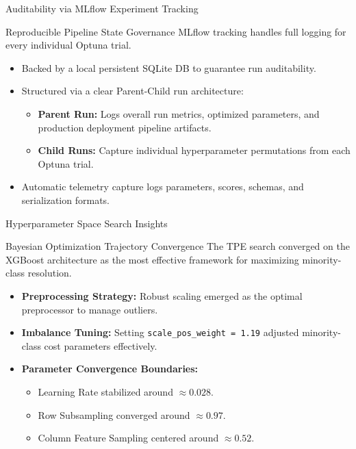 \begin{frame}{Auditability via MLflow Experiment Tracking}
\begin{block}{Reproducible Pipeline State Governance}
MLflow tracking handles full logging for every individual Optuna trial.
\end{block}
\begin{itemize}
    \item Backed by a local persistent SQLite DB to guarantee run auditability.
    \item Structured via a clear Parent-Child run architecture:
    \begin{itemize}
        \item \textbf{Parent Run:} Logs overall run metrics, optimized parameters, and production deployment pipeline artifacts.
        \item \textbf{Child Runs:} Capture individual hyperparameter permutations from each Optuna trial.
    \end{itemize}
    \item Automatic telemetry capture logs parameters, scores, schemas, and serialization formats.
\end{itemize}
\end{frame}

\begin{frame}{Hyperparameter Space Search Insights}
\begin{exampleblock}{Bayesian Optimization Trajectory Convergence}
The TPE search converged on the XGBoost architecture as the most effective framework for maximizing minority-class resolution.
\end{exampleblock}
\vspace{0.1cm}
\begin{itemize}
    \item \textbf{Preprocessing Strategy:} Robust scaling emerged as the optimal preprocessor to manage outliers.
    \item \textbf{Imbalance Tuning:} Setting \texttt{scale\_pos\_weight = 1.19} adjusted minority-class cost parameters effectively.
    \item \textbf{Parameter Convergence Boundaries:}
    \begin{itemize}
        \item Learning Rate stabilized around $\approx 0.028$.
        \item Row Subsampling converged around $\approx 0.97$.
        \item Column Feature Sampling centered around $\approx 0.52$.
    \end{itemize}
\end{itemize}
\end{frame}
